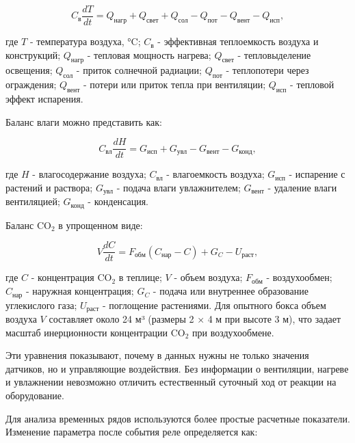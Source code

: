 \documentclass[a4paper,14pt]{extarticle}
\begin{document}
\begin{equation}
C_{\text{в}} \frac{dT}{dt} = Q_{\text{нагр}} + Q_{\text{свет}} + Q_{\text{сол}} - Q_{\text{пот}} - Q_{\text{вент}} - Q_{\text{исп}},
\tag{2.1}
\end{equation}

где \(T\) - температура воздуха, °C; \(C_{\text{в}}\) - эффективная
теплоемкость воздуха и конструкций; \(Q_{\text{нагр}}\) - тепловая
мощность нагрева; \(Q_{\text{свет}}\) - тепловыделение освещения;
\(Q_{\text{сол}}\) - приток солнечной радиации; \(Q_{\text{пот}}\) -
теплопотери через ограждения; \(Q_{\text{вент}}\) - потери или приток
тепла при вентиляции; \(Q_{\text{исп}}\) - тепловой эффект испарения.

Баланс влаги можно представить как:

\begin{equation}
C_{\text{вл}} \frac{dH}{dt} = G_{\text{исп}} + G_{\text{увл}} - G_{\text{вент}} - G_{\text{конд}},
\tag{2.2}
\end{equation}

где \(H\) - влагосодержание воздуха; \(C_{\text{вл}}\) - влагоемкость
воздуха; \(G_{\text{исп}}\) - испарение с растений и раствора;
\(G_{\text{увл}}\) - подача влаги увлажнителем; \(G_{\text{вент}}\) -
удаление влаги вентиляцией; \(G_{\text{конд}}\) - конденсация.

Баланс CO\(_2\) в упрощенном виде:

\begin{equation}
V \frac{dC}{dt} = F_{\text{обм}}(C_{\text{нар}} - C) + G_C - U_{\text{раст}},
\tag{2.3}
\end{equation}

где \(C\) - концентрация CO\(_2\) в теплице; \(V\) - объем воздуха;
\(F_{\text{обм}}\) - воздухообмен; \(C_{\text{нар}}\) - наружная
концентрация; \(G_C\) - подача или внутреннее образование углекислого
газа; \(U_{\text{раст}}\) - поглощение растениями. Для опытного бокса
объем воздуха \(V\) составляет около 24 м³ (размеры 2 × 4 м при высоте 3
м), что задает масштаб инерционности концентрации CO\(_2\) при
воздухообмене.

Эти уравнения показывают, почему в данных нужны не только значения
датчиков, но и управляющие воздействия. Без информации о вентиляции,
нагреве и увлажнении невозможно отличить естественный суточный ход от
реакции на оборудование.

Для анализа временных рядов используются более простые расчетные
показатели. Изменение параметра после события реле определяется как:
\end{document}
